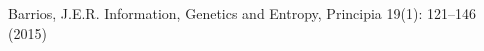 \documentclass[
12pt,		%
openright,	%
twoside,  %
a4paper,			%
chapter=TITLE,		%
english,			%
french,				%
spanish,			%
brazil				%
]{USPSC-classe/USPSC_RedarTex}
\begin{document}
\begin{flushleft}
\begin{flushleft}
\begin{flushleft}
\begin{flushleft}
\begin{flushleft}
\begin{flushleft}
\begin{flushleft}
\begin{flushleft}
\begin{flushleft}
\begin{flushleft}
[Barrios, 2015] Barrios, J.E.R. Information, Genetics and Entropy, Principia 19(1): 121–146 (2015)
\end{flushleft}


\end{flushleft}


\end{flushleft}


\end{flushleft}


\end{flushleft}


\end{flushleft}


\end{flushleft}


\end{flushleft}


\end{flushleft}


\end{flushleft}
\end{document}
